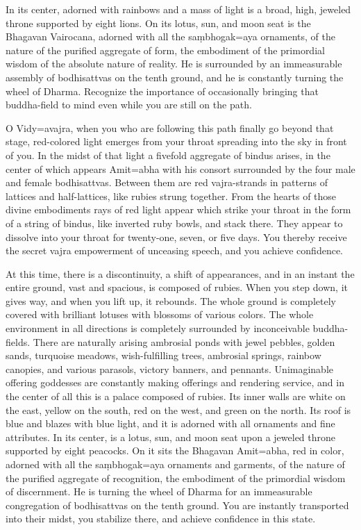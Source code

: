 \documentclass[11pt,twocolumn]{article}
\begin{document}
In its center, adorned with rainbows and a mass of light is a broad,
high, jeweled throne supported by eight lions. On its lotus, sun, and
moon seat is the Bhagavan Vairocana, adorned with all the
sa\d{m}bhogak\a={a}ya ornaments, of the nature of the purified
aggregate of form, the embodiment of the primordial wisdom of the
absolute nature of reality. He is surrounded by an immeasurable
assembly of bodhisattvas on the tenth ground, and he is constantly
turning the wheel of Dharma. Recognize the importance of occasionally
bringing that buddha\hyp{}field to mind even while you are still on
the path.

O Vidy\a={a}vajra, when you who are following this path finally go
beyond that stage, red\hyp{}colored light emerges from your throat
spreading into the sky in front of you.  In the midst of that light a
fivefold aggregate of bindus arises, in the center of which appears
Amit\a={a}bha with his consort surrounded by the four male and female
bodhisattvas. Between them are red vajra\hyp{}strands in patterns of
lattices and half\hyp{}lattices, like rubies strung together. From the
hearts of those divine embodiments rays of red light appear which
strike your throat in the form of a string of bindus, like inverted
ruby bowls, and stack there. They appear to dissolve into your throat
for twenty\hyp{}one, seven, or five days. You thereby receive the
secret vajra empowerment of unceasing speech, and you achieve
confidence.

At this time, there is a discontinuity, a shift of appearances, and in
an instant the entire ground, vast and spacious, is composed of
rubies. When you step down, it gives way, and when you lift up, it
rebounds. The whole ground is completely covered with brilliant
lotuses with blossoms of various colors. The whole environment in all
directions is completely surrounded by inconceivable
buddha\hyp{}fields. There are naturally arising ambrosial ponds with
jewel pebbles, golden sands, turquoise meadows, wish\hyp{}fulfilling
trees, ambrosial springs, rainbow canopies, and various parasols,
victory banners, and pennants. Unimaginable offering goddesses are
constantly making offerings and rendering service, and in the center
of all this is a palace composed of rubies. Its inner walls are white
on the east, yellow on the south, red on the west, and green on the
north. Its roof is blue and blazes with blue light, and it is adorned
with all ornaments and fine attributes. In its center, is a lotus,
sun, and moon seat upon a jeweled throne supported by eight
peacocks. On it sits the Bhagavan Amit\a={a}bha, red in color, adorned
with all the sa\d{m}bhogak\a={a}ya ornaments and garments, of the
nature of the purified aggregate of recognition, the embodiment of the
primordial wisdom of discernment. He is turning the wheel of Dharma
for an immeasurable congregation of bodhisattvas on the tenth
ground. You are instantly transported into their midst, you stabilize
there, and achieve confidence in this state.
\end{document}
